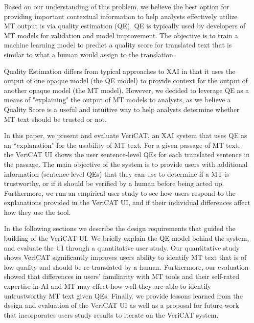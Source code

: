 Based on our understanding of this problem, we believe the best option for providing important contextual information to help analysts effectively utilize MT output is via quality estimation (QE). QE is typically used by developers of MT models for validation and model improvement. The objective is to train a machine learning model to predict a quality score for translated text that is similar to what a human would assign to the translation\cite{mauvcec2019machine}.  

Quality Estimation differs from typical approaches to XAI in that it uses the output of one opaque model (the QE model) to provide context for the output of another opaque model (the MT model). However, we decided to leverage QE as a means of "explaining" the output of MT models to analysts, as we believe a Quality Score is a useful and intuitive way to help analysts determine whether MT text should be trusted or not.    



In this paper, we present and evaluate VeriCAT, an XAI system that uses QE as an ``explanation" for the usability of MT text. For a given passage of MT text, the VeriCAT UI shows the user sentence-level QEs for each translated sentence in the passage. The main objective of the system is to provide users with additional information (sentence-level QEs) that they can use to determine if a MT is trustworthy, or if it should be verified by a human before being acted up. Furthermore, we run an empirical user study to see how users respond to the explanations provided in the VeriCAT UI, and if their individual differences affect how they use the tool.  

In the following sections we describe the design requirements that guided the building of the VeriCAT UI. We briefly explain the QE model behind the system, and evaluate the UI through a quantitative user study. Our quantitative study shows VeriCAT significantly improves users ability to identify MT text that is of low quality and should be re-translated by a human. Furthermore, our evaluation showed that differences in users' familiarity with MT tools and their self-rated expertise in AI and MT may effect how well they are able to identify untrustworthy MT text given QEs. Finally, we provide lessons learned from the design and evaluation of the VeriCAT UI as well as a proposal for future work that incorporates users study results to iterate on the VeriCAT system.

